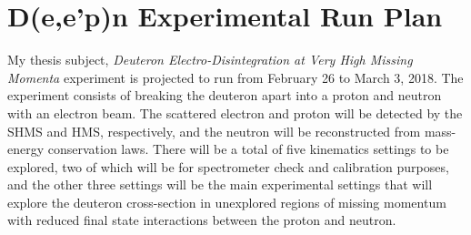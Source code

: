\documentclass[letterpaper, 12 pt, conference]{ieeeconf}  %
\begin{document}
\section{D(e,e'p)n Experimental Run Plan}
\noindent My thesis subject, \textit{Deuteron Electro-Disintegration at Very High Missing Momenta} experiment is projected to run from February 26 to
March 3, 2018. The experiment consists of breaking the deuteron apart into a proton and neutron with an electron beam. The scattered electron and proton
will be detected by the SHMS and HMS, respectively, and the neutron will be reconstructed from mass-energy conservation laws. There will be a total of
five kinematics settings to be explored, two of which will be for spectrometer check and calibration purposes, and the other three settings will be the main
experimental settings that will explore the deuteron cross-section in unexplored regions of missing momentum with reduced final state interactions between
the proton and neutron. \\
\end{document}
